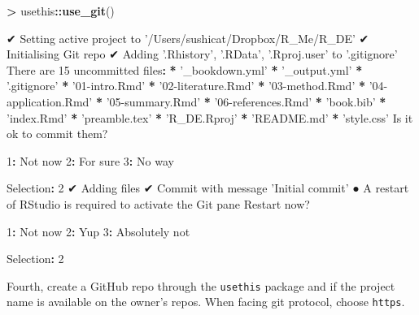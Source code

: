 \documentclass[]{book}
\newenvironment{Shaded}{\begin{snugshade}}{\end{snugshade}}
\newcommand{\DecValTok}[1]{\textcolor[rgb]{0.00,0.00,0.81}{#1}}
\newcommand{\ErrorTok}[1]{\textcolor[rgb]{0.64,0.00,0.00}{\textbf{#1}}}
\newcommand{\KeywordTok}[1]{\textcolor[rgb]{0.13,0.29,0.53}{\textbf{#1}}}
\newcommand{\NormalTok}[1]{#1}
\newcommand{\OperatorTok}[1]{\textcolor[rgb]{0.81,0.36,0.00}{\textbf{#1}}}
\newcommand{\StringTok}[1]{\textcolor[rgb]{0.31,0.60,0.02}{#1}}
\begin{document}
\begin{Shaded}
\begin{Highlighting}[]
\OperatorTok{>}\StringTok{ }\NormalTok{usethis}\OperatorTok{::}\KeywordTok{use_git}\NormalTok{()}

\NormalTok{✔ Setting active project to }\StringTok{'/Users/sushicat/Dropbox/R_Me/R_DE'}
\NormalTok{✔ Initialising Git repo}
\NormalTok{✔ Adding }\StringTok{'.Rhistory'}\NormalTok{, }\StringTok{'.RData'}\NormalTok{, }\StringTok{'.Rproj.user'}\NormalTok{ to }\StringTok{'.gitignore'}
\NormalTok{There are }\DecValTok{15}\NormalTok{ uncommitted files}\OperatorTok{:}
\ErrorTok{*}\StringTok{ '_bookdown.yml'}
\OperatorTok{*}\StringTok{ '_output.yml'}
\OperatorTok{*}\StringTok{ '.gitignore'}
\OperatorTok{*}\StringTok{ '01-intro.Rmd'}
\OperatorTok{*}\StringTok{ '02-literature.Rmd'}
\OperatorTok{*}\StringTok{ '03-method.Rmd'}
\OperatorTok{*}\StringTok{ '04-application.Rmd'}
\OperatorTok{*}\StringTok{ '05-summary.Rmd'}
\OperatorTok{*}\StringTok{ '06-references.Rmd'}
\OperatorTok{*}\StringTok{ 'book.bib'}
\OperatorTok{*}\StringTok{ 'index.Rmd'}
\OperatorTok{*}\StringTok{ 'preamble.tex'}
\OperatorTok{*}\StringTok{ 'R_DE.Rproj'}
\OperatorTok{*}\StringTok{ 'README.md'}
\OperatorTok{*}\StringTok{ 'style.css'}
\NormalTok{Is it ok to commit them?}

\DecValTok{1}\OperatorTok{:}\StringTok{ }\NormalTok{Not now}
\DecValTok{2}\OperatorTok{:}\StringTok{ }\NormalTok{For sure}
\DecValTok{3}\OperatorTok{:}\StringTok{ }\NormalTok{No way}

\NormalTok{Selection}\OperatorTok{:}\StringTok{ }\DecValTok{2}
\NormalTok{✔ Adding files}
\NormalTok{✔ Commit with message }\StringTok{'Initial commit'}
\NormalTok{● A restart of RStudio is required to activate the Git pane}
\NormalTok{Restart now?}

\DecValTok{1}\OperatorTok{:}\StringTok{ }\NormalTok{Not now}
\DecValTok{2}\OperatorTok{:}\StringTok{ }\NormalTok{Yup}
\DecValTok{3}\OperatorTok{:}\StringTok{ }\NormalTok{Absolutely not}

\NormalTok{Selection}\OperatorTok{:}\StringTok{ }\DecValTok{2}
\end{Highlighting}
\end{Shaded}

Fourth, create a GitHub repo through the \texttt{usethis} package and if the project name is available on the owner's repos. When facing git protocol, choose \texttt{https}.
\end{document}
